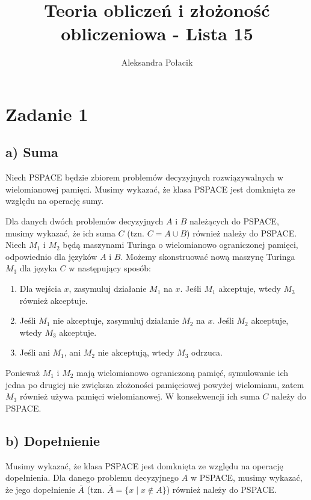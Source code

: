\documentclass{article}
\title{Teoria obliczeń i złożoność obliczeniowa - Lista 15}
\author{Aleksandra Połacik}
\begin{document}
\maketitle



\section{Zadanie 1}

\subsection*{a) Suma}
Niech PSPACE będzie zbiorem problemów decyzyjnych rozwiązywalnych w wielomianowej pamięci. Musimy wykazać, że klasa PSPACE jest domknięta ze względu na operację sumy.

Dla danych dwóch problemów decyzyjnych $A$ i $B$ należących do PSPACE, musimy wykazać, że ich suma $C$ (tzn. $C = A \cup B$) również należy do PSPACE.
Niech $M_1$ i $M_2$ będą maszynami Turinga o wielomianowo ograniczonej pamięci, odpowiednio dla języków $A$ i $B$. Możemy skonstruować nową maszynę Turinga $M_3$ dla języka $C$ w następujący sposób:

\begin{enumerate}
    \item Dla wejścia $x$, zasymuluj działanie $M_1$ na $x$. Jeśli $M_1$ akceptuje, wtedy $M_3$ również akceptuje.
    \item Jeśli $M_1$ nie akceptuje, zasymuluj działanie $M_2$ na $x$. Jeśli $M_2$ akceptuje, wtedy $M_3$ akceptuje.
    \item Jeśli ani $M_1$, ani $M_2$ nie akceptują, wtedy $M_3$ odrzuca.
\end{enumerate}

Ponieważ $M_1$ i $M_2$ mają wielomianowo ograniczoną pamięć, symulowanie ich jedna po drugiej nie zwiększa złożoności pamięciowej powyżej wielomianu, zatem $M_3$ również używa pamięci wielomianowej. W konsekwencji ich suma $C$ należy do PSPACE.

\subsection*{b) Dopełnienie}
Musimy wykazać, że klasa PSPACE jest domknięta ze względu na operację dopełnienia.
Dla danego problemu decyzyjnego $A$ w PSPACE, musimy wykazać, że jego dopełnienie $\overline{A}$ (tzn. $\overline{A} = \{x \mid x \notin A\}$) również należy do PSPACE.
\end{document}
